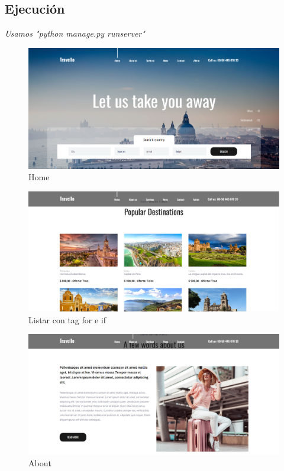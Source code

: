 \documentclass{article}
\begin{document}
  \subsection{Ejecución}
  \textit{Usamos "python manage.py runserver"}
  \begin{figure}[H]
    \centering
    \includegraphics[width=1\textwidth, keepaspectratio]{img/ejecucion1.png}
    \caption{Home}
  \end{figure}
  \newpage
  \begin{figure}[H]
    \centering
    \includegraphics[width=1\textwidth, keepaspectratio]{img/ejecucion2.png}
    \caption{Listar con tag for e if}
  \end{figure}
  \begin{figure}[H]
    \centering
    \includegraphics[width=1\textwidth, keepaspectratio]{img/ejecucion3.png}
    \caption{About}
  \end{figure}
\end{document}
